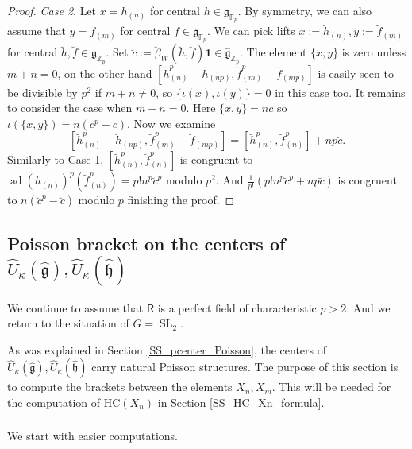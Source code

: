 \documentclass{amsart}
\theoremstyle{definition}
\newcommand{\sss}{\subsubsection{}}
\newcommand{\Ring}{\mathsf{R}}
\newcommand{\g}{\mathfrak{g}}
\newcommand{\hg}{\hat{\mathfrak{g}}}
\newcommand{\hh}{\hat{\mathfrak{h}}}
\newcommand{\HC}{\mathrm{HC}} %
\newcommand{\F}{\mathbb{F}}
\newcommand{\Z}{\mathbb{Z}}
\numberwithin{equation}{section}
\begin{document}
\begin{proof}
{\it Case 2}. Let $x=h_{(n)}$ for central $h\in \g_{\F_p}$. By symmetry, we can also assume that $y=f_{(m)}$ for central $f\in \g_{\F_p}$. We can pick lifts $\breve{x}:=\breve{h}_{(n)}, \breve{y}:=\breve{f}_{(m)}$ for central $\breve{h},\breve{f}\in \g_{\Z_p}$. Set $\breve{c}:=\breve{\beta}_W(\breve{h},\breve{f})\mathbf{1}\in \hg_{\Z_p}$. The element $\{x,y\}$ is zero unless $m+n=0$, on the other hand $[\breve{h}^p_{(n)}-\breve{h}_{(np)}, \breve{f}^p_{(m)}-\breve{f}_{(mp)}]$ is easily seen to be divisible by $p^2$ if $m+n\neq 0$, so $\{\iota(x),\iota(y)\}=0$ in this case too. It remains to consider the case when $m+n=0$. Here $\{x,y\}=nc$ so $\iota(\{x,y\})=n(c^p-c)$. Now we examine $$[\breve{h}^p_{(n)}-\breve{h}_{(np)}, \breve{f}^p_{(m)}-\breve{f}_{(mp)}]=[\breve{h}^p_{(n)},\breve{f}^p_{(n)}]+np\breve{c}.$$
Similarly to Case 1, $[\breve{h}^p_{(n)},\breve{f}^p_{(n)}]$ is congruent 
to $\operatorname{ad}(h_{(n)})^p(\breve{f}^p_{(n)})=p!n^p\breve{c}^p$ modulo $p^2$.
And $\frac{1}{p!}(p!n^p\breve{c}^p+np\breve{c})$ is congruent to $n(\breve{c}^p-\breve{c})$ modulo $p$ finishing the proof.
 \end{proof}

\subsection{Poisson bracket on the centers of $\widehat{U}_\kappa(\hg), \widehat{U}_\kappa(\hh)$}
We continue to assume that $\Ring$ is a perfect field of characteristic $p>2$. And we return to the situation of $G=\operatorname{SL}_2$.

As was explained in Section \ref{SS_pcenter_Poisson}, the centers of $\widehat{U}_\kappa(\hg),\widehat{U}_\kappa(\hh)$ carry  natural Poisson structures. The purpose of this section is to compute the brackets between the elements $X_n,X_m$. This will be needed for the computation of $\HC(X_n)$ in  Section \ref{SS_HC_Xn_formula}.

\sss
We start with easier computations.
\end{document}
